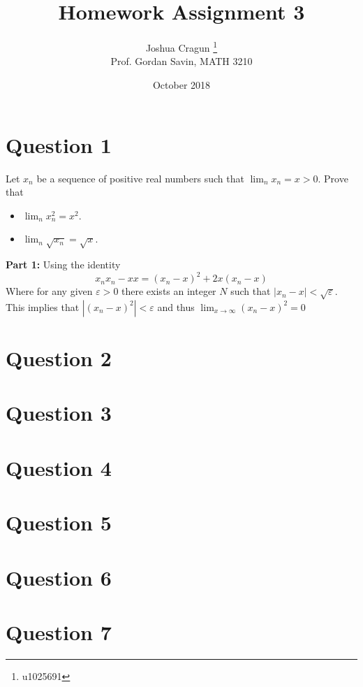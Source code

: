 \documentclass[12pt, letterpaper]{article}
\title{Homework Assignment 3}
\author{Joshua Cragun \thanks{u1025691} \\ Prof. Gordan Savin, MATH 3210}
\date{October 2018}
\begin{document}
\begin{titlepage}
\maketitle
\end{titlepage}

\pagebreak

\section*{Question 1}
Let $x_n$ be a sequence of positive real numbers such that $\lim_n x_n =x>0$. Prove that
\begin{itemize}
\item
$\lim_n x_n^2= x^2$.
\item
$\lim_n \sqrt{x_n}= \sqrt{x}$.
\end{itemize}

\noindent\textbf{Part 1:} Using the identity
$$ x_nx_n - xx = (x_n - x)^2 + 2x(x_n - x) $$
Where for any given $\varepsilon > 0$ there exists an integer $N$ such that $|x_n - x| < \sqrt{\varepsilon}$.
This implies that $|(x_n - x)^2| < \varepsilon$ and thus $\lim_{x\to\infty} (x_n - x)^2 = 0$

\section*{Question 2}
\section*{Question 3}
\section*{Question 4}
\section*{Question 5}
\section*{Question 6}
\section*{Question 7}
\end{document}
